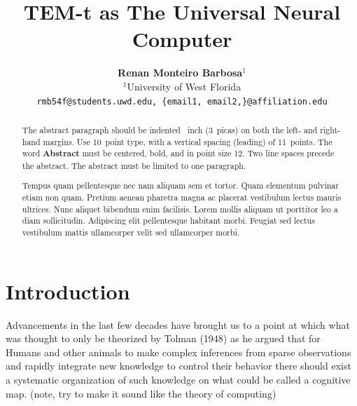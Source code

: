 \documentclass{article}
\title{TEM-t as The Universal Neural Computer}
\author{
  \textbf{Renan Monteiro Barbosa$^{1}$} \\ 
  $^{1}$University of West Florida \\ 
  \texttt{rmb54f@students.uwd.edu, \{email1, email2,\}@affiliation.edu}
}
\begin{document}
\maketitle



\begin{abstract}
The abstract paragraph should be indented ~inch (3~picas) on both the left- and right-hand margins. Use 10~point type, with a vertical spacing (leading) of 11~points.  The word \textbf{Abstract} must be centered, bold, and in point size 12. Two line spaces precede the abstract. The abstract must be limited to one paragraph.

Tempus quam pellentesque nec nam aliquam sem et tortor. 
Quam elementum pulvinar etiam non quam. 
Pretium aenean pharetra magna ac placerat vestibulum lectus mauris ultrices. 
Nunc aliquet bibendum enim facilisis. 
Lorem mollis aliquam ut porttitor leo a diam sollicitudin. 
Adipiscing elit pellentesque habitant morbi. 
Feugiat sed lectus vestibulum mattis ullamcorper velit sed ullamcorper morbi.
\end{abstract}


\section{Introduction}

Advancements in the last few decades have brought us to a point at which what was thought to only be theorized by Tolman (1948) as he argued that for Humans and other animals to make complex inferences from sparse observations and rapidly integrate new knowledge to control their behavior there should exist a systematic organization of such knowledge on what could be called a cognitive map. (note, try to make it sound like the theory of computing)
\end{document}
